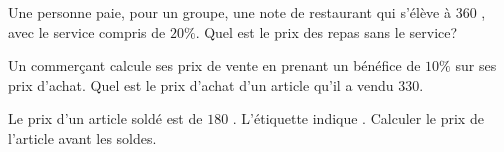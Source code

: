 \documentclass[11pt,a4paper]{article}  %
\begin{document}

\begin{enumMet}
	\item Une personne paie, pour un groupe, une note de restaurant qui s'élève à 360 \EUR{}, avec le service compris de $20 \%$. Quel est le prix des repas sans le service?
	\item {} Un commerçant calcule ses prix de vente en prenant un bénéfice de $10 \%$ sur ses prix d'achat. Quel est le prix d'achat d'un article qu'il a vendu $330$\EUR{}.
	\item Le prix d'un article soldé est de $180$ \EUR{}. L'étiquette indique . Calculer le prix de l'article avant les soldes.
\end{enumMet}
\end{document}
